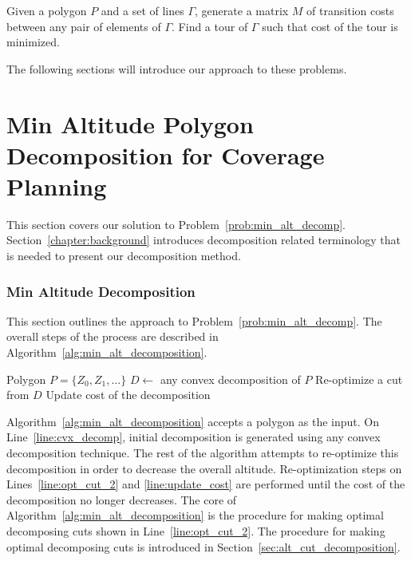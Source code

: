 \documentclass[../main.tex]{subfiles}
\begin{document}
\begin{problem}
\label{prob:min_tour}
Given a polygon $P$ and a set of lines $\Gamma$, generate a matrix $M$ of transition costs between any pair of elements of $\Gamma$. Find a tour of $\Gamma$ such that cost of the tour is minimized.
\end{problem}

The following sections will introduce our approach to these problems.

\section{Min Altitude Polygon Decomposition for Coverage Planning}
\label{section:min_alt_decomposition}

This section covers our solution to Problem~\ref{prob:min_alt_decomp}. Section~\ref{chapter:background} introduces decomposition related terminology that is needed to present our decomposition method.

\subsubsection{Min Altitude Decomposition}
This section outlines the approach to Problem~\ref{prob:min_alt_decomp}. The overall steps of the process are described in Algorithm~\ref{alg:min_alt_decomposition}.
\begin{algorithm}
	\caption{$\operatorname{min\_alt\_decomposition}(P)$}
	\label{alg:min_alt_decomposition}
	\begin{algorithmic}[1]
		\REQUIRE Polygon $P=\{Z_0,Z_1,\ldots\}$
			\STATE $D\gets$ any convex decomposition of $P$	\label{line:cvx_decomp}
			\REPEAT
				\STATE Re-optimize a cut from $D$ \label{line:opt_cut_2}
				\STATE Update cost of the decomposition \label{line:update_cost}
	\end{algorithmic}
\end{algorithm}

Algorithm~\ref{alg:min_alt_decomposition} accepts a polygon as the input. On Line~\ref{line:cvx_decomp}, initial decomposition is generated using any convex decomposition technique. The rest of the algorithm attempts to re-optimize this decomposition in order to decrease the overall altitude. Re-optimization steps on Lines~\ref{line:opt_cut_2} and \ref{line:update_cost} are performed until the cost of the decomposition no longer decreases. The core of Algorithm~\ref{alg:min_alt_decomposition} is the procedure for making optimal decomposing cuts shown in Line~\ref{line:opt_cut_2}. The procedure for making optimal decomposing cuts is introduced in Section~\ref{sec:alt_cut_decomposition}.
\end{document}
